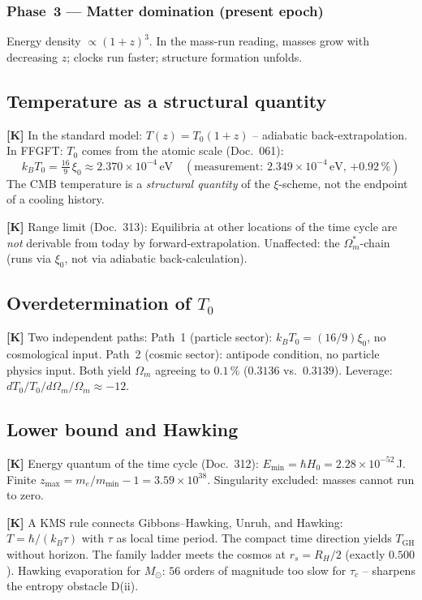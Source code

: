 \subsubsection{Phase~3 --- Matter domination (present epoch)}

Energy density $\propto (1+z)^3$. In the mass-run reading,
masses grow with decreasing $z$; clocks run faster; structure
formation unfolds.

\subsection{Temperature as a structural quantity}

\textbf{[K]} In the standard model: $T(z) = T_0(1+z)$ -- adiabatic
back-extrapolation. In FFGFT: $T_0$ comes from the atomic scale
(Doc.~061):
\[
k_B T_0 = \tfrac{16}{9}\,\xi_0 \approx 2.370\times10^{-4}\,\text{eV}
\quad(\text{measurement: }2.349\times10^{-4}\,\text{eV, }{+0.92\,\%})
\]
The CMB temperature is a \emph{structural quantity} of the $\xi$-scheme,
not the endpoint of a cooling history.

\textbf{[K]} Range limit (Doc.~313): Equilibria at other locations
of the time cycle are \emph{not} derivable from today by
forward-extrapolation. Unaffected: the $\Omega_m^*$-chain (runs via
$\xi_0$, not via adiabatic back-calculation).

\subsection{Overdetermination of $T_0$}

\textbf{[K]} Two independent paths:
Path~1 (particle sector): $k_BT_0 = (16/9)\xi_0$, no cosmological input.
Path~2 (cosmic sector): antipode condition, no particle physics input.
Both yield $\Omega_m$ agreeing to $0.1\,\%$
($0.3136$ vs.\ $0.3139$).
Leverage: $dT_0/T_0 \big/ d\Omega_m/\Omega_m \approx -12$.

\subsection{Lower bound and Hawking}

\textbf{[K]} Energy quantum of the time cycle (Doc.~312):
$E_\text{min} = \hbar H_0 = 2.28\times10^{-52}$\,J.
Finite $z_\text{max} = m_e/m_\text{min} - 1 = 3.59\times10^{38}$.
Singularity excluded: masses cannot run to zero.

\textbf{[K]} A KMS rule connects Gibbons--Hawking, Unruh, and
Hawking: $T = \hbar/(k_B\tau)$ with $\tau$ as local time period.
The compact time direction yields $T_\text{GH}$ without horizon.
The family ladder meets the cosmos at $r_s = R_H/2$ (exactly $0.500$).
Hawking evaporation for $M_\odot$: $56$ orders of magnitude too slow
for $\tau_c$ -- sharpens the entropy obstacle D(ii).

